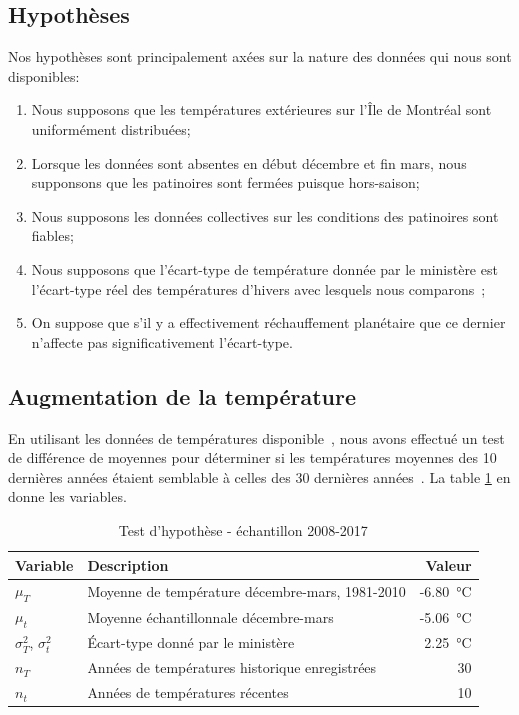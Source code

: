 \documentclass[12pt]{article}
\numberwithin{figure}{section}
\numberwithin{table}{section}
\begin{document}
\subsection{Hypoth\`eses}

Nos hypoth\`eses sont principalement ax\'ees sur la nature des donn\'ees qui nous sont disponibles:

\begin{enumerate}
    \item Nous supposons que les temp\'eratures ext\'erieures sur l'\^Ile de Montr\'eal sont
        uniform\'ement distribu\'ees;
    \item Lorsque les donn\'ees sont absentes en d\'ebut d\'ecembre et fin mars, nous supponsons que
        les patinoires sont ferm\'ees puisque hors-saison;
    \item Nous supposons les donn\'ees collectives sur les conditions des patinoires sont fiables;
    \item Nous supposons que l'\'ecart-type de temp\'erature donn\'ee par le minist\`ere est
        l'\'ecart-type r\'eel des temp\'eratures d'hivers avec lesquels nous comparons~\cite{AvgTemp};
    \item On suppose que s'il y a effectivement r\'echauffement plan\'etaire que ce dernier
        n'affecte pas significativement l'\'ecart-type.
\end{enumerate}

\subsection{Augmentation de la temp\'erature}

En utilisant les donn\'ees de temp\'eratures disponible~\cite{TempHist}, nous avons effectu\'e un
test de diff\'erence de moyennes pour d\'eterminer si les temp\'eratures moyennes des 10 derni\`eres
ann\'ees \'etaient semblable \`a celles des 30 derni\`eres ann\'ees~\cite{MeteoTemp}. La table
\ref{vars:hyptest} en donne les variables.

\begin{table}
    \centering
    \begin{tabular}{|l|l|r|}\hline
        Variable &Description &Valeur\\\hline
        $\mu_T$ &Moyenne de temp\'erature d\'ecembre-mars, 1981-2010 &-\SI{6.80}\celsius\\\hline
        $\mu_t$ &Moyenne \'echantillonnale d\'ecembre-mars &-\SI{5.06}\celsius\\\hline
        $\sigma_T^2$, $\sigma_t^2$ &\'Ecart-type donn\'e par le minist\`ere &\SI{2.25}\celsius\\\hline
        $n_T$ &Ann\'ees de temp\'eratures historique enregistr\'ees &30\\\hline
        $n_t$ &Ann\'ees de temp\'eratures r\'ecentes &10\\\hline
    \end{tabular}
    \caption{Test d'hypoth\`ese - \'echantillon 2008-2017}\label{vars:hyptest}
\end{table}
\end{document}

